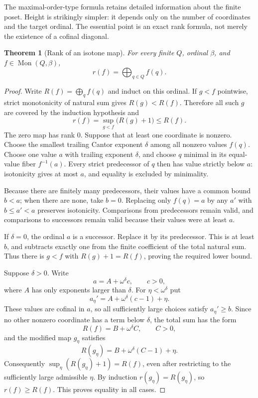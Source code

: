 \documentclass[11pt,a4paper]{article}
\newtheorem{theorem}{Theorem}[section]
\theoremstyle{definition}
\theoremstyle{remark}
\newcommand{\Mon}{\operatorname{Mon}}
\begin{document}
The maximal-order-type formula retains detailed information about the
finite poset. Height is strikingly simpler: it depends only on the number
of coordinates and the target ordinal. The essential point is an exact
rank formula, not merely the existence of a cofinal diagonal.

\begin{theorem}[Rank of an isotone map]\label{thm:rank}
For every finite $Q$, ordinal $\beta$, and $f\in\Mon(Q,\beta)$,
\begin{equation}\label{eq:rankformula}
 \boxed{r(f)=\bigoplus_{q\in Q}f(q).}
\end{equation}
\end{theorem}
\begin{proof}
Write $R(f)=\bigoplus_q f(q)$ and induct on this ordinal. If $g<f$
pointwise, strict monotonicity of natural sum gives $R(g)<R(f)$.
Therefore all such $g$ are covered by the induction hypothesis and
\[
 r(f)=\sup_{g<f}\bigl(R(g)+1\bigr)\leq R(f).
\]
The zero map has rank $0$. Suppose that at least one coordinate is nonzero.
Choose the smallest trailing Cantor exponent $\delta$ among all nonzero
values $f(q)$. Choose one value $a$ with trailing exponent $\delta$, and
choose $q$ minimal in its equal-value fiber $f^{-1}(a)$. Every strict
predecessor of $q$ then has value strictly below $a$: isotonicity gives
at most $a$, and equality is excluded by minimality.

Because there are finitely many predecessors, their values have a common
bound $b<a$; when there are none, take $b=0$. Replacing only $f(q)=a$ by
any $a'$ with $b\leq a'<a$ preserves isotonicity. Comparisons from
predecessors remain valid, and comparisons to successors remain valid
because their values were at least $a$.

If $\delta=0$, the ordinal $a$ is a successor. Replace it by its
predecessor. This is at least $b$, and subtracts exactly one from the
finite coefficient of the total natural sum. Thus there is $g<f$ with
$R(g)+1=R(f)$, proving the required lower bound.

Suppose $\delta>0$. Write
\[
 a=A+\omega^\delta c,\qquad c>0,
\]
where $A$ has only exponents larger than $\delta$. For $\eta<\omega^\delta$
put
\[
 a_\eta'=A+\omega^\delta(c-1)+\eta.
\]
These values are cofinal in $a$, so all sufficiently large choices satisfy
$a_\eta'\geq b$. Since no other nonzero coordinate has a term below
$\delta$, the total sum has the form
\[
 R(f)=B+\omega^\delta C,\qquad C>0,
\]
and the modified map $g_\eta$ satisfies
\[
 R(g_\eta)=B+\omega^\delta(C-1)+\eta.
\]
Consequently
$\sup_\eta(R(g_\eta)+1)=R(f)$, even after restricting to the sufficiently
large admissible $\eta$. By induction $r(g_\eta)=R(g_\eta)$, so
$r(f)\geq R(f)$. This proves equality in all cases.
\end{proof}
\end{document}
